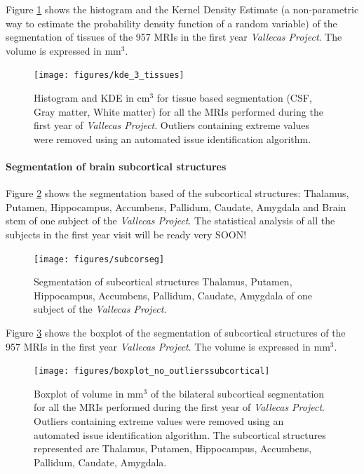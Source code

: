 \documentclass[11pt]{article}
\theoremstyle{definition}
\theoremstyle{remark}
\begin{document}
Figure \ref{fig:kde_3_tissues} shows the histogram and the Kernel Density Estimate (a non-parametric way to estimate the probability density function of a random variable) of the segmentation of tissues of the 957 MRIs in the first year \emph{Vallecas Project}. The volume is expressed in mm${^3}$.
\begin{figure}[H]
        \centering
        \texttt{[image: figures/kde\_3\_tissues]}
        \caption{Histogram and KDE in cm${^3}$ for tissue based segmentation (CSF, Gray matter, White matter) for all the MRIs performed during the first year of \emph{Vallecas Project}. Outliers containing extreme values were removed using an automated issue identification algorithm.} 
        \label{fig:kde_3_tissues}
\end{figure}


\paragraph*{Segmentation of brain subcortical structures}

Figure \ref{fig:subcorseg} shows the segmentation based of the subcortical structures: Thalamus, Putamen, Hippocampus, Accumbens, Pallidum, Caudate, Amygdala and Brain stem of one subject of the \emph{Vallecas Project}. The statistical analysis of all the subjects in the first year visit  will be ready very SOON! 

\begin{figure}[H]
        \centering
        \texttt{[image: figures/subcorseg]}
        \caption{Segmentation of subcortical structures Thalamus, Putamen, Hippocampus, Accumbens, Pallidum, Caudate, Amygdala of one subject of the \emph{Vallecas Project}. } 
        \label{fig:subcorseg}
\end{figure}

Figure \ref{fig:boxsubcor} shows the boxplot of the segmentation of subcortical structures of the 957 MRIs in the first year \emph{Vallecas Project}. The volume is expressed in mm${^3}$.
\begin{figure}[H]
        \centering
        \texttt{[image: figures/boxplot\_no\_outlierssubcortical]}
        \caption{Boxplot of volume in mm${^3}$ of the bilateral subcortical segmentation for all the MRIs performed during the first year of \emph{Vallecas Project}. Outliers containing extreme values were removed using an automated issue identification algorithm. The subcortical structures represented are Thalamus, Putamen, Hippocampus, Accumbens, Pallidum, Caudate, Amygdala.} 
        \label{fig:boxsubcor}
\end{figure}
\end{document}
